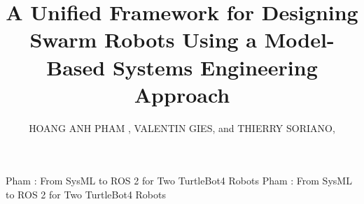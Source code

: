 \documentclass{ieeeaccess}
\begin{document}
\doi{}

\title{A Unified Framework for Designing Swarm Robots Using a Model-Based Systems Engineering Approach
}
\author{\uppercase{Hoang Anh Pham}
, %
\uppercase{Valentin Gies}, and \uppercase{Thierry Soriano}, 
}

\address[1]{Faculty of Electronics Engineering 1, Post and Telecommunications Institute of Technology, Hanoi, Vietnam 
}

\address[2]{Laboratory IM2NP, University of Toulon, Toulon, France 
}

\address[3]{Laboratory COSMER, University of Toulon, Toulon, France 
}
\markboth
{Pham \headeretal: From SysML to ROS 2 for Two TurtleBot4 Robots}
{Pham \headeretal: From SysML to ROS 2 for Two TurtleBot4 Robots}

\end{document}

